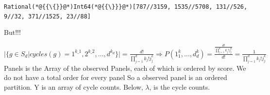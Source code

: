 \documentclass[12pt,a4paper]{article}
\begin{document}
\begin{lstlisting}
Rational(*@{{\{}}@*)Int64(*@{{\}}}@*)[787//3159, 1535//5708, 131//526, 9//32, 371//1525, 23//88]
\end{lstlisting}


But!!!


$|\{ g \ensuremath{\in} S_d | cycles(g) = 1^{k\ensuremath{\_1}},2^{k\ensuremath{\_2}},\ensuremath{\ldots},d^{k_d} \}| = \frac{d!}{\ensuremath{\prod}_{j=1}^{d} k_j!j^k_j } \ensuremath{\Longrightarrow} P(1^k_1, \ensuremath{\ldots} , d^k_d) = \frac{\frac{d!}{\ensuremath{\prod}_{j=1}^{d} k_j!j^k_j }}{d!} = \frac{1}{\ensuremath{\prod}_{j=1}^{d} k_j!j^k_j }$ Panels is the Array of the observed Panels, each of which is ordered by score. We do not have a total order for every panel So a observed panel is an ordered partition. Y is an array of cycle counts. Below, \ensuremath{\lambda}, is the cycle counts.
\end{document}
